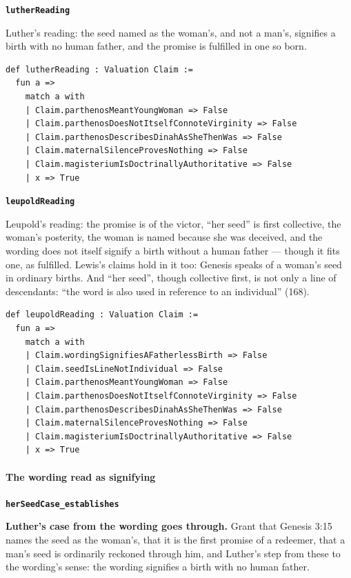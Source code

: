 \documentclass[11pt]{article}
\begin{document}
\par\medskip\noindent\textbf{\texttt{luther\allowbreak{}Reading}}\par\nobreak\noindent
Luther’s reading: the seed named as the woman’s, and not a man’s, signifies a birth with no human father, and the promise is fulfilled in one so born.

{\small\begin{verbatim}
def lutherReading : Valuation Claim :=
  fun a =>
    match a with
    | Claim.parthenosMeantYoungWoman => False
    | Claim.parthenosDoesNotItselfConnoteVirginity => False
    | Claim.parthenosDescribesDinahAsSheThenWas => False
    | Claim.maternalSilenceProvesNothing => False
    | Claim.magisteriumIsDoctrinallyAuthoritative => False
    | x => True
\end{verbatim}}
\par\medskip\noindent\textbf{\texttt{leupold\allowbreak{}Reading}}\par\nobreak\noindent
Leupold’s reading: the promise is of the victor, “her seed” is first collective, the woman’s posterity, the woman is named because she was deceived, and the wording does not itself signify a birth without a human father — though it fits one, as fulfilled. Lewis’s claims hold in it too: Genesis speaks of a woman’s seed in ordinary births. And “her seed”, though collective first, is not only a line of descendants: “the word is also used in reference to an individual” (168).

{\small\begin{verbatim}
def leupoldReading : Valuation Claim :=
  fun a =>
    match a with
    | Claim.wordingSignifiesAFatherlessBirth => False
    | Claim.seedIsLineNotIndividual => False
    | Claim.parthenosMeantYoungWoman => False
    | Claim.parthenosDoesNotItselfConnoteVirginity => False
    | Claim.parthenosDescribesDinahAsSheThenWas => False
    | Claim.maternalSilenceProvesNothing => False
    | Claim.magisteriumIsDoctrinallyAuthoritative => False
    | x => True
\end{verbatim}}
\paragraph*{The wording read as signifying}
\leavevmode\par\nobreak
\par\medskip\noindent\textbf{\texttt{her\allowbreak{}Seed\allowbreak{}Case\_\allowbreak{}establishes}}\par\nobreak\noindent
\textbf{Luther’s case from the wording goes through.} Grant that Genesis 3:15 names the seed as the woman’s, that it is the first promise of a redeemer, that a man’s seed is ordinarily reckoned through him, and Luther’s step from these to the wording’s sense: the wording signifies a birth with no human father.
\end{document}
